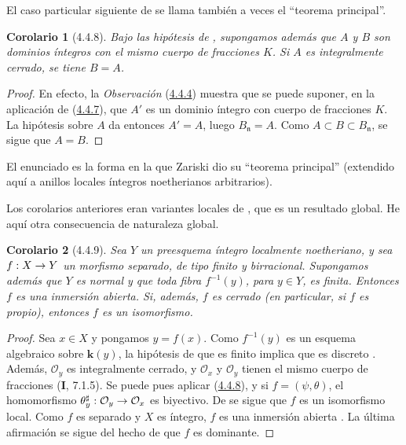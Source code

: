 \documentclass[10pt,oneside,openany]{book}
\theoremstyle{egaenv}\newtheorem*{env}{---}
\theoremstyle{egastatement}
\newtheorem*{corollary}{Corolario}
\theoremstyle{egadescription}
\renewcommand{\to}{\mathchoice{\longrightarrow}{\rightarrow}{\rightarrow}{\rightarrow}}
\begin{document}
El caso particular siguiente de  se llama también a
veces el ``teorema principal''.

\begin{corollary}[4.4.8]
\label{III.4.4.8}
\label{III.4.4.8-fr}
Bajo las hipótesis de , supongamos además que $A$ y
$B$ son dominios íntegros con el mismo cuerpo de fracciones $K$.
Si $A$ es
integralmente cerrado, se tiene $B=A$.
\end{corollary}

\begin{proof}
En efecto, la \emph{Observación} (\hyperref[III.4.4.4-fr]{4.4.4}) muestra que se puede
suponer, en la aplicación de (\hyperref[III.4.4.7-fr]{4.4.7}), que $A'$ es un dominio íntegro con
cuerpo de fracciones $K$. La hipótesis sobre $A$ da entonces
$A'=A$, luego $B_{\mathfrak n}=A$. Como
$A\subset B\subset B_{\mathfrak n}$, se sigue que $A=B$.
\end{proof}

El enunciado  es la forma en la que Zariski dio su
``teorema principal'' (extendido aquí a anillos locales íntegros
noetherianos arbitrarios).

Los corolarios anteriores eran variantes locales de
, que es un resultado global. He aquí otra
consecuencia de naturaleza global.

\begin{corollary}[4.4.9]
\label{III.4.4.9}
\label{III.4.4.9-fr}
Sea $Y$ un preesquema íntegro localmente noetheriano, y sea
$f:X\to Y$ un morfismo separado, de tipo finito y birracional.
Supongamos además que $Y$ es normal y que toda fibra $f^{-1}(y)$,
para $y\in Y$, es finita. Entonces $f$ es una inmersión abierta. Si,
además, $f$ es cerrado (en particular, si $f$ es propio), entonces
$f$ es un isomorfismo.
\end{corollary}

\begin{proof}
Sea $x\in X$ y pongamos $y=f(x)$. Como $f^{-1}(y)$ es un esquema
algebraico sobre $\boldsymbol{k}(y)$, la hipótesis de que es finito implica que
es discreto . Además, $\mathcal O_y$ es integralmente
cerrado, y $\mathcal O_x$ y $\mathcal O_y$ tienen el mismo cuerpo de fracciones (\textbf{I}, 7.1.5). Se puede pues aplicar (\hyperref[III.4.4.8-fr]{4.4.8}), y si $f=(\psi,\theta)$, el homomorfismo
$\theta_y^\sharp:\mathcal O_y\to\mathcal O_x$
es biyectivo. De  se sigue que $f$ es un isomorfismo
local. Como $f$ es separado y $X$ es íntegro, $f$ es una inmersión
abierta . La última afirmación se sigue del hecho de
que $f$ es dominante.
\end{proof}
\end{document}
